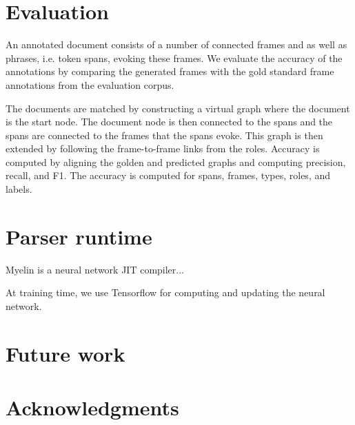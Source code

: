 \documentclass[11pt,a4paper]{article}
\begin{document}
\section{Evaluation}

An annotated document consists of a number of connected frames and as well as
phrases, i.e. token spans, evoking these frames. We evaluate the accuracy of the
annotations by comparing the generated frames with the gold standard frame
annotations from the evaluation corpus.

The documents are matched by constructing a virtual graph where the document
is the start node. The document node is then connected to the spans and the
spans are connected to the frames that the spans evoke. This graph is then
extended by following the frame-to-frame links from the roles. Accuracy is
computed by aligning the golden and predicted graphs and computing precision,
recall, and F1. The accuracy is computed for spans, frames, types, roles, and
labels.

\section{Parser runtime}

Myelin is a neural network JIT compiler...

At training time, we use Tensorflow for computing and updating the neural
network.

\section{Future work}



\section{Acknowledgments}



\end{document}
